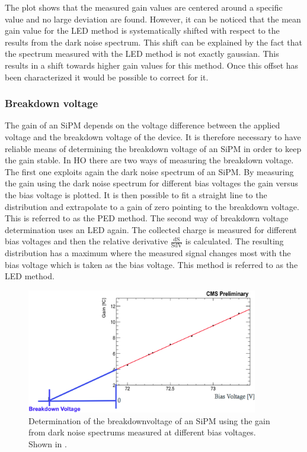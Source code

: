 The plot shows that the measured gain values are centered around a specific value and no large deviation are found. However, it can be noticed that the mean gain value for the LED method is systematically shifted with respect to the results from the dark noise spectrum. This shift can be explained by the fact that the spectrum measured with the LED method is not exactly gaussian. This results in a shift towards higher gain values for this method. Once this offset has been characterized it would be possible to correct for it.

\subsubsection{Breakdown voltage}
The gain of an SiPM depends on the voltage difference between the applied voltage and the breakdown voltage of the device. It is therefore necessary to have reliable means of determining the breakdown voltage of an SiPM in order to keep the gain stable. In HO there are two ways of measuring the breakdown voltage. The first one exploits again the dark noise spectrum of an SiPM. By measuring the gain using the dark noise spectrum for different bias voltages the gain versus the bias voltage is plotted. It is then possible to fit a straight line to the distribution and extrapolate to a gain of zero pointing to the breakdown voltage. This is referred to as the PED method. The second way of breakdown voltage determination uses an LED again. The collected charge is measured for different bias voltages and then the relative derivative $\frac{\text{dS}}{\text{SdV}}$ is calculated. The resulting distribution has a maximum where the measured signal changes most with the bias voltage which is taken as the bias voltage. This method is referred to as the LED method.
\begin{figure}[bh]
\centering
\includegraphics[width=0.9\textwidth]{Figures/kuensken/bvPedDetermination.png}
\caption{Determination of the breakdownvoltage of an SiPM using the gain from dark noise spectrums measured at different bias voltages. Shown in \cite{kuenskenCalor}.}
\label{kuenskenbvPed}
\end{figure}
